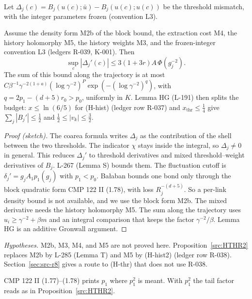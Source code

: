 Let $\Delta_j(c)=B_j(u(c);\bar u)-B_j(u(c);u(c))$ be the threshold mismatch, with the integer parameters frozen (convention L3).

\begin{proposition}\label{src:HTHR}
Assume the density form M2b of the block bound, the extraction cost M4, the history holomorphy M5, the history weights M3, and the frozen-integer convention L3 (ledgers R-039, K-001). Then
\[\sup_c|\Delta_j'(c)|\le3(1+3r)A\,\Phi(g_j^{-2}).\]
The sum of this bound along the trajectory is at most $C\beta^{-1}\gamma^{-2(1+a)}(\log\gamma^{-2})^P\exp(-(\log\gamma^{-2})^q)$, with $q=2p_1-(d+5)r_0>p_0$, uniformly in $K$. Lemma HG (L-191) then splits the budget: $x\le\ln(6/5)$ for (H-hist) (ledger row R-037) and $x_{\mathrm{thr}}\le\tfrac14$ give $\sum_j|B_j'|\le\tfrac12$ and $\tfrac12\le|v_k|\le\tfrac32$.
\end{proposition}
\begin{proof}[Proof (sketch)]
The coarea formula writes $\Delta_j$ as the contribution of the shell between the two thresholds. The indicator $\chi$ stays inside the integral, so $\Delta_j\ne0$ in general. This reduces $\Delta_j'$ to threshold derivatives and mixed threshold--weight derivatives of $B_j$. L-267 (Lemma S) bounds them. The fluctuation cutoff is $\delta_j'=g_jA_1p_1(g_j)$ with $p_1<p_0$. Ba{\l}aban bounds one bond only through the block quadratic form CMP 122 II (1.78), with loss $R_j^{-(d+5)}$. So a per-link density bound is not available, and we use the block form M2b. The mixed derivative needs the history holomorphy M5. The sum along the trajectory uses $u_i\ge\gamma^{-2}+\beta m$ and an integral comparison that keeps the factor $\gamma^{-2}/\beta$. Lemma HG is an additive Gronwall argument.
\end{proof}
\emph{Hypotheses.} M2b, M3, M4, and M5 are not proved here. Proposition~\ref{src:HTHR2} replaces M2b by L-285 (Lemma T) and M5 by (H-hist2) (ledger row R-038). Section~\ref{sec:src-r8} gives a route to (H-thr) that does not use R-038.

\begin{remark}
CMP 122 II (1.77)--(1.78) prints $p_1$ where $p_1^2$ is meant. With $p_1^2$ the tail factor reads as in Proposition~\ref{src:HTHR2}.
\end{remark}

